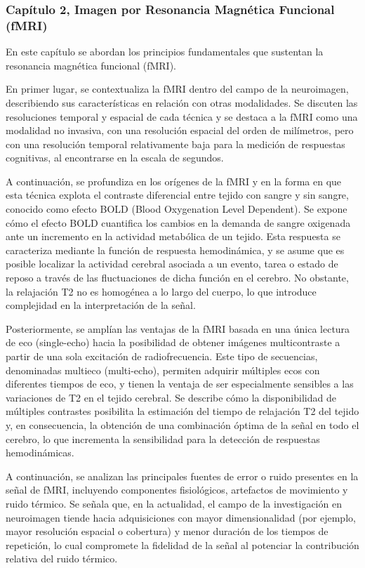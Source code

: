 \subsubsection{Capítulo 2, Imagen por Resonancia Magnética Funcional (fMRI)}

En este capítulo se abordan los principios fundamentales que sustentan la resonancia magnética funcional (fMRI).

En primer lugar, se contextualiza la fMRI dentro del campo de la neuroimagen, describiendo sus características en relación con otras modalidades. Se discuten las resoluciones temporal y espacial de cada técnica y se destaca a la fMRI como una modalidad no invasiva, con una resolución espacial del orden de milímetros, pero con una resolución temporal relativamente baja para la medición de respuestas cognitivas, al encontrarse en la escala de segundos.

A continuación, se profundiza en los orígenes de la fMRI y en la forma en que esta técnica explota el contraste diferencial entre tejido con sangre y sin sangre, conocido como efecto BOLD (Blood Oxygenation Level Dependent). Se expone cómo el efecto BOLD cuantifica los cambios en la demanda de sangre oxigenada ante un incremento en la actividad metabólica de un tejido. Esta respuesta se caracteriza mediante la función de respuesta hemodinámica, y se asume que es posible localizar la actividad cerebral asociada a un evento, tarea o estado de reposo a través de las fluctuaciones de dicha función en el cerebro. No obstante, la relajación T2 no es homogénea a lo largo del cuerpo, lo que introduce complejidad en la interpretación de la señal.

Posteriormente, se amplían las ventajas de la fMRI basada en una única lectura de eco (single-echo) hacia la posibilidad de obtener imágenes multicontraste a partir de una sola excitación de radiofrecuencia. Este tipo de secuencias, denominadas multieco (multi-echo), permiten adquirir múltiples ecos con diferentes tiempos de eco, y tienen la ventaja de ser especialmente sensibles a las variaciones de T2 en el tejido cerebral. Se describe cómo la disponibilidad de múltiples contrastes posibilita la estimación del tiempo de relajación T2 del tejido y, en consecuencia, la obtención de una combinación óptima de la señal en todo el cerebro, lo que incrementa la sensibilidad para la detección de respuestas hemodinámicas.

A continuación, se analizan las principales fuentes de error o ruido presentes en la señal de fMRI, incluyendo componentes fisiológicos, artefactos de movimiento y ruido térmico. Se señala que, en la actualidad, el campo de la investigación en neuroimagen tiende hacia adquisiciones con mayor dimensionalidad (por ejemplo, mayor resolución espacial o cobertura) y menor duración de los tiempos de repetición, lo cual compromete la fidelidad de la señal al potenciar la contribución relativa del ruido térmico.

